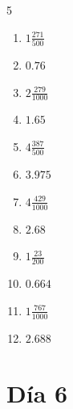 \documentclass[12pt]{article}
\begin{document}
\begin{multicols}{5}
\begin{enumerate}
\item $ 1 \frac{271}{500} $
\item $ 0.76 $
\item $ 2 \frac{279}{1000} $
\item $ 1.65 $
\item $ 4 \frac{387}{500} $
\item $ 3.975 $
\item $ 4 \frac{429}{1000} $
\item $ 2.68 $
\item $ 1 \frac{23}{200} $
\item $ 0.664 $
\item $ 1 \frac{767}{1000} $
\item $ 2.688 $
\end{enumerate}\end{multicols}\newpage
\section*{Día 6}
\end{document}
